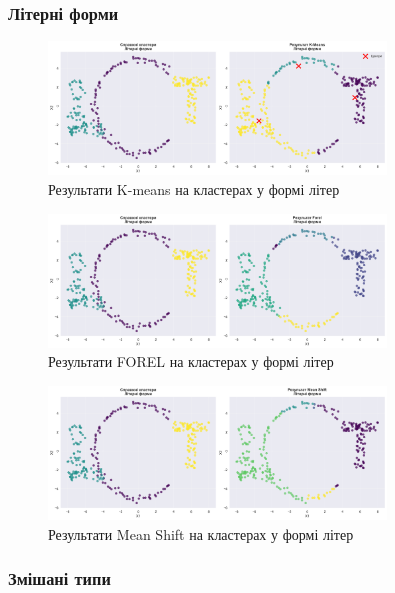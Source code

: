 \documentclass[12pt,a4paper]{article}
\begin{document}
\subsubsection{Літерні форми}

\begin{figure}[H]
\centering
\includegraphics[width=0.8\textwidth]{clustering_visualizations/K-means_Літерні_форми_results.png}
\caption{Результати K-means на кластерах у формі літер}
\label{fig:kmeans_letters}
\end{figure}

\begin{figure}[H]
\centering
\includegraphics[width=0.8\textwidth]{clustering_visualizations/FOREL_Літерні_форми_results.png}
\caption{Результати FOREL на кластерах у формі літер}
\label{fig:forel_letters}
\end{figure}

\begin{figure}[H]
\centering
\includegraphics[width=0.8\textwidth]{clustering_visualizations/Mean Shift_Літерні_форми_results.png}
\caption{Результати Mean Shift на кластерах у формі літер}
\label{fig:meanshift_letters}
\end{figure}

\subsubsection{Змішані типи}
\end{document}
